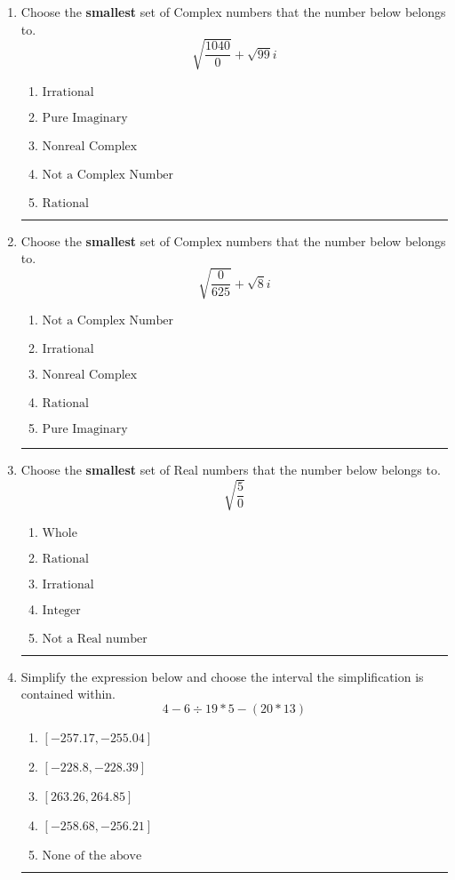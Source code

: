 \documentclass[14pt]{extbook}
\newcommand{\litem}[1]{\item#1\hspace*{-1cm}\rule{\textwidth}{0.4pt}}
\begin{document}
\begin{enumerate}
{\begin{enumerate}[label=\Alph*.]
\end{enumerate} }
\litem{
Choose the \textbf{smallest} set of Complex numbers that the number below belongs to.\[ \sqrt{\frac{1040}{0}}+\sqrt{99} i \]\begin{enumerate}[label=\Alph*.]
\item \( \text{Irrational} \)
\item \( \text{Pure Imaginary} \)
\item \( \text{Nonreal Complex} \)
\item \( \text{Not a Complex Number} \)
\item \( \text{Rational} \)

\end{enumerate} }
\litem{
Choose the \textbf{smallest} set of Complex numbers that the number below belongs to.\[ \sqrt{\frac{0}{625}}+\sqrt{8}i \]\begin{enumerate}[label=\Alph*.]
\item \( \text{Not a Complex Number} \)
\item \( \text{Irrational} \)
\item \( \text{Nonreal Complex} \)
\item \( \text{Rational} \)
\item \( \text{Pure Imaginary} \)

\end{enumerate} }
\litem{
Choose the \textbf{smallest} set of Real numbers that the number below belongs to.\[ \sqrt{\frac{5}{0}} \]\begin{enumerate}[label=\Alph*.]
\item \( \text{Whole} \)
\item \( \text{Rational} \)
\item \( \text{Irrational} \)
\item \( \text{Integer} \)
\item \( \text{Not a Real number} \)

\end{enumerate} }
\litem{
Simplify the expression below and choose the interval the simplification is contained within.\[ 4 - 6 \div 19 * 5 - (20 * 13) \]\begin{enumerate}[label=\Alph*.]
\item \( [-257.17, -255.04] \)
\item \( [-228.8, -228.39] \)
\item \( [263.26, 264.85] \)
\item \( [-258.68, -256.21] \)
\item \( \text{None of the above} \)


\end{enumerate}}
\end{enumerate}
\end{document}
